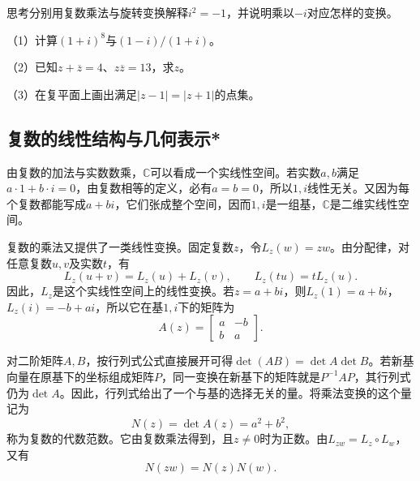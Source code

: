 {\kaiti{}思考\quad 分别用复数乘法与旋转变换解释\(i^{2} = - 1\)，并说明乘以\(- i\)对应怎样的变换。}

\begin{exercise}
\mbox{}\par\nobreak

（1）计算\((1+i)^8\)与\((1-i)/(1+i)\)。

（2）已知\(z+\overline z=4\)、\(z\overline z=13\)，求\(z\)。

（3）在复平面上画出满足\(|z-1|=|z+1|\)的点集。
\end{exercise}

\newpage
\subsection{复数的线性结构与几何表示*}
由复数的加法与实数数乘，\(\mathbb{C}\)可以看成一个实线性空间。若实数\(a , b\)满足\(a \cdot 1 + b \cdot i = 0\)，由复数相等的定义，必有\(a = b = 0\)，所以\(1 , i\)线性无关。又因为每个复数都能写成\(a + b i\)，它们张成整个空间，因而\(1 , i\)是一组基，\(\mathbb{C}\)是二维实线性空间。

复数的乘法又提供了一类线性变换。固定复数\(z\)，令\(L_{z} \left( w \right) = z w\)。由分配律，对任意复数\(u , v\)及实数\(t\)，有
\begin{equation}
    L_{z} \left( u + v \right) = L_{z} \left( u \right) + L_{z} \left( v \right) , \qquad
    L_{z} \left( t u \right) = t L_{z} \left( u \right) .
\end{equation}
因此，\(L_{z}\)是这个实线性空间上的线性变换。若\(z = a + b i\)，则\(L_{z} \left( 1 \right) = a + b i\)，\(L_{z} \left( i \right) = - b + a i\)，所以它在基\(1 , i\)下的矩阵为
\begin{equation}\label{eq:complex-matrix}
    A \left( z \right) = \left[ \begin{matrix}a & - b \\ b & a\end{matrix} \right] .
\end{equation}

对二阶矩阵\(A , B\)，按行列式公式直接展开可得\(\det \left( A B \right) = \det A \det B\)。若新基向量在原基下的坐标组成矩阵\(P\)，同一变换在新基下的矩阵就是\(P^{- 1} A P\)，其行列式仍为\(\det A\)。因此，行列式给出了一个与基的选择无关的量。将乘法变换的这个量记为
\begin{equation}
    N \left( z \right) = \det A \left( z \right) = a^{2} + b^{2} ,
\end{equation}
称为复数的{\heiti{}代数范数}。它由复数乘法得到，且\(z \ne 0\)时为正数。由\(L_{z w} = L_{z} \circ L_{w}\)，又有
\begin{equation}
    N \left( z w \right) = N \left( z \right) N \left( w \right) .
\end{equation}

